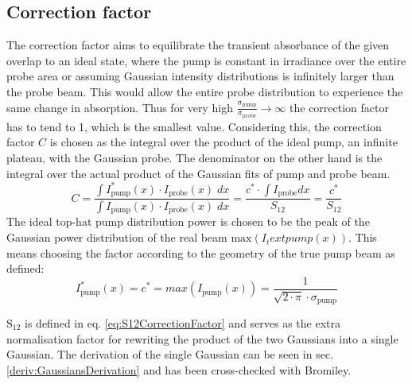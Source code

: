 \documentclass[twoside,openright,listof=numbered]{scrreprt}
\begin{document}
\subsection{Correction factor}\label{sec:CorrFactor}
The correction factor aims to equilibrate the transient absorbance of the given  overlap to an ideal state, where the pump is constant in irradiance over the entire probe area or assuming Gaussian intensity distributions is infinitely larger than the probe beam. This would allow the entire probe distribution to experience the same change in absorption.
Thus for very high $\mathrm{\frac{\sigma_\text{pump}}{\sigma_\text{probe}} \rightarrow \infty}$ the correction factor has to tend to 1, which is the smallest value.
Considering this, the correction factor $C$ is chosen as the integral over the product of the ideal pump, an infinite plateau, with the Gaussian probe. The denominator on the other hand is the integral over the actual product of the Gaussian fits of pump and probe beam.  
\begin{equation}\label{eq:CorrFactorGaussians} 
C = \dfrac{\int I_\text{pump}^*(x)\cdot I_\text{probe}(x) \;dx}{\int I_\text{pump}(x)\cdot I_\text{probe}(x) \; dx} = \dfrac{c^*\cdot \int I_\text{probe} dx}{S_{12}} = \dfrac{c^*}{S_{12}}
\end{equation}
The ideal top-hat pump distribution power is chosen to be the peak of the Gaussian power distribution of the real beam $\mathrm{max}\left(I_text{pump}(x)\right)$. This means choosing the factor according to the geometry of the true pump beam as defined:
\begin{equation*}\label{eq:maxPowerGauss}
I_\text{pump}^*(x) = c^* = max(I_\text{pump}(x)) = \frac{1}{\sqrt{2\cdot\pi}\cdot\sigma_\text{pump}}
\end{equation*}

$\mathrm{S_{12}}$ is defined in eq. \ref{eq:S12CorrectionFactor} and serves as the extra normalisation factor for rewriting the product of the two Gaussians into a single Gaussian. The derivation of the single Gaussian can be seen in sec. \ref{deriv:GaussiansDerivation} and has been cross-checked with Bromiley.\cite{Bromiley2014}
\end{document}
